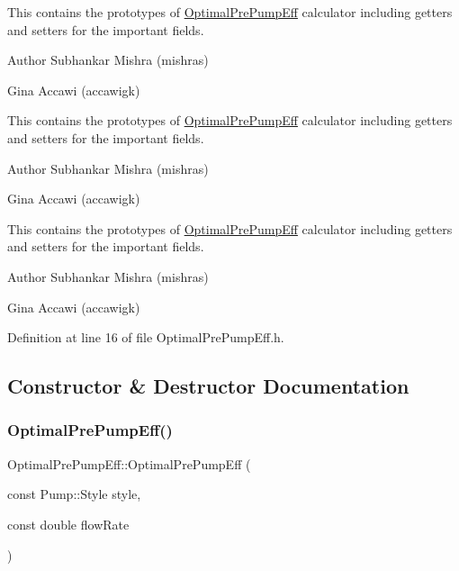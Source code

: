 This contains the prototypes of \hyperlink{class_optimal_pre_pump_eff}{Optimal\+Pre\+Pump\+Eff} calculator including getters and setters for the important fields.

\begin{DoxyAuthor}{Author}
Subhankar Mishra (mishras) 

Gina Accawi (accawigk) 
\end{DoxyAuthor}


This contains the prototypes of \hyperlink{class_optimal_pre_pump_eff}{Optimal\+Pre\+Pump\+Eff} calculator including getters and setters for the important fields.

\begin{DoxyAuthor}{Author}
Subhankar Mishra (mishras) 

Gina Accawi (accawigk) 
\end{DoxyAuthor}


This contains the prototypes of \hyperlink{class_optimal_pre_pump_eff}{Optimal\+Pre\+Pump\+Eff} calculator including getters and setters for the important fields.

\begin{DoxyAuthor}{Author}
Subhankar Mishra (mishras) 

Gina Accawi (accawigk) 
\end{DoxyAuthor}


Definition at line 16 of file Optimal\+Pre\+Pump\+Eff.\+h.



\subsection{Constructor \& Destructor Documentation}
\mbox{\label{class_optimal_pre_pump_eff_acd025ad710fbc57a548ae3343752ad6d}} 
\subsubsection{\texorpdfstring{Optimal\+Pre\+Pump\+Eff()}{OptimalPrePumpEff()}\hspace{0.1cm}{\footnotesize\ttfamily [1/3]}}
{\footnotesize\ttfamily Optimal\+Pre\+Pump\+Eff\+::\+Optimal\+Pre\+Pump\+Eff (\begin{DoxyParamCaption}\item[{const Pump\+::\+Style}]{style,  }\item[{const double}]{flow\+Rate }\end{DoxyParamCaption})\hspace{0.3cm}{\ttfamily [inline]}}

